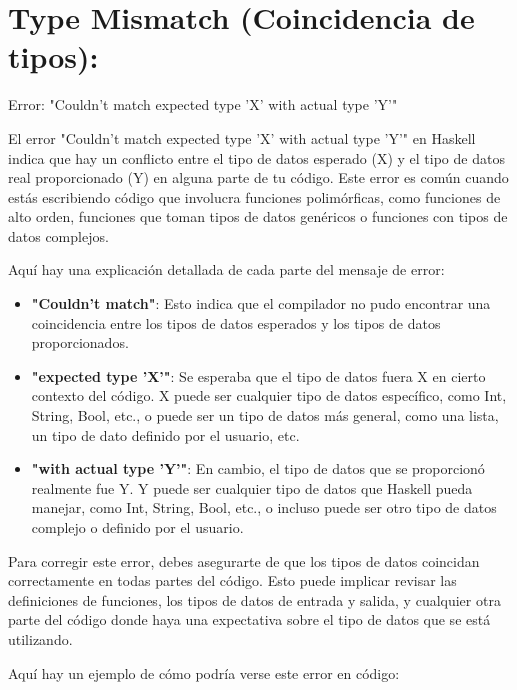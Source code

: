 \documentclass{article}
\begin{document}
\section{Type Mismatch (Coincidencia de tipos):}

\begin{mdframed}[backgroundcolor=red!40,shadow=true,shadowsize=2pt,roundcorner=2pt]
    Error: "Couldn't match expected type 'X' with actual type 'Y'"
\end{mdframed}

El error "Couldn't match expected type 'X' with actual type 'Y'" en Haskell indica que hay un conflicto entre el tipo de datos esperado (X) y el tipo de datos real proporcionado (Y) en alguna parte de tu código. Este error es común cuando estás escribiendo código que involucra funciones polimórficas, como funciones de alto orden, funciones que toman tipos de datos genéricos o funciones con tipos de datos complejos.

Aquí hay una explicación detallada de cada parte del mensaje de error:

\begin{itemize}
    \item \textbf{"Couldn't match"}: Esto indica que el compilador no pudo encontrar una coincidencia entre los tipos de datos esperados y los tipos de datos proporcionados.
    
    \item \textbf{"expected type 'X'"}: Se esperaba que el tipo de datos fuera X en cierto contexto del código. X puede ser cualquier tipo de datos específico, como Int, String, Bool, etc., o puede ser un tipo de datos más general, como una lista, un tipo de dato definido por el usuario, etc.
    
    \item \textbf{"with actual type 'Y'"}: En cambio, el tipo de datos que se proporcionó realmente fue Y. Y puede ser cualquier tipo de datos que Haskell pueda manejar, como Int, String, Bool, etc., o incluso puede ser otro tipo de datos complejo o definido por el usuario.
\end{itemize}

Para corregir este error, debes asegurarte de que los tipos de datos coincidan correctamente en todas partes del código. Esto puede implicar revisar las definiciones de funciones, los tipos de datos de entrada y salida, y cualquier otra parte del código donde haya una expectativa sobre el tipo de datos que se está utilizando.

Aquí hay un ejemplo de cómo podría verse este error en código:
\end{document}
